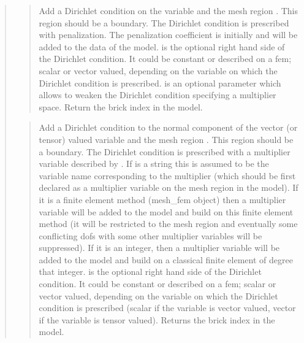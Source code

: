 \documentclass[a4paper,11pt,english]{sphinxmanual}
\begin{document}
\begin{quote}
\begin{quote}

Add a Dirichlet condition on the variable  and the mesh
region . This region should be a boundary. The Dirichlet
condition is prescribed with penalization. The penalization coefficient
is initially  and will be added to the data of the model.
 is the optional right hand side of the Dirichlet condition.
It could be constant or described on a fem; scalar or vector valued,
depending on the variable on which the Dirichlet condition is prescribed.
 is an optional parameter which allows to weaken the
Dirichlet condition specifying a multiplier space.
Return the brick index in the model.
\end{quote}

\begin{quote}

Add a Dirichlet condition to the normal component of the vector
(or tensor) valued variable  and the mesh
region . This region should be a boundary. The Dirichlet
condition is prescribed with a multiplier variable described by
. If  is a string this is assumed
to be the variable name corresponding to the multiplier (which should be
first declared as a multiplier variable on the mesh region in the model).
If it is a finite element method (mesh\_fem object) then a multiplier
variable will be added to the model and build on this finite element
method (it will be restricted to the mesh region  and eventually
some conflicting dofs with some other multiplier variables will be
suppressed). If it is an integer, then a  multiplier variable will be
added to the model and build on a classical finite element of degree
that integer.  is the optional right hand side of  the
Dirichlet condition. It could be constant or described on a fem; scalar
or vector valued, depending on the variable on which the Dirichlet
condition is prescribed (scalar if the variable
is vector valued, vector if the variable is tensor valued).
Returns the brick index in the model.
\end{quote}


\end{quote}
\end{document}
